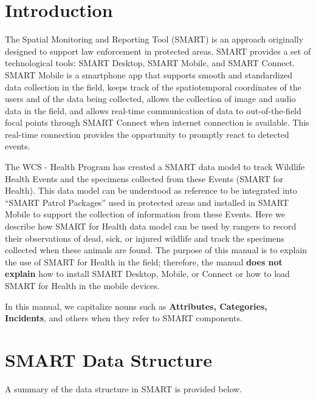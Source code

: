 \documentclass[
  letterpaper,
  DIV=11,
  numbers=noendperiod]{scrreprt}
\begin{document}
\hypertarget{introduction-1}{%
\section*{Introduction}\label{introduction-1}}


The Spatial Monitoring and Reporting Tool (SMART) is an approach
originally designed to support law enforcement in protected areas. SMART
provides a set of technological tools: SMART Desktop, SMART Mobile, and
SMART Connect. SMART Mobile is a smartphone app that supports smooth and
standardized data collection in the field, keeps track of the
spatiotemporal coordinates of the users and of the data being collected,
allows the collection of image and audio data in the field, and allows
real-time communication of data to out-of-the-field focal points through
SMART Connect when internet connection is available. This real-time
connection provides the opportunity to promptly react to detected
events.

The WCS - Health Program has created a SMART data model to track
Wildlife Health Events and the specimens collected from these Events
(SMART for Health). This data model can be understood as reference to be
integrated into ``SMART Patrol Packages'' used in protected areas and
installed in SMART Mobile to support the collection of information from
these Events. Here we describe how SMART for Health data model can be
used by rangers to record their observations of dead, sick, or injured
wildlife and track the specimens collected when these animals are found.
The purpose of this manual is to explain the use of SMART for Health in
the field; therefore, the manual \textbf{does not explain} how to
install SMART Desktop, Mobile, or Connect or how to load SMART for
Health in the mobile devices.

In this manual, we capitalize nouns such as \textbf{Attributes,
Categories, Incidents}, and others when they refer to SMART components.

\hypertarget{smart-data-structure}{%
\section*{SMART Data Structure}\label{smart-data-structure}}


A summary of the data structure in SMART is provided below.
\end{document}

